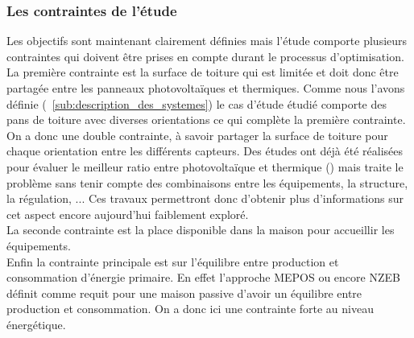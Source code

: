 \subsubsection{Les contraintes de l’étude} %
\label{ssub:les_contraintes_de_l_etude}
Les objectifs sont maintenant clairement définies mais l’étude comporte plusieurs
contraintes qui doivent être prises en compte durant le processus d’optimisation.
La première contrainte est la surface de toiture qui est limitée et doit donc être
partagée entre les panneaux photovoltaïques et thermiques. Comme nous l’avons définie
(~\autoref{sub:description_des_systemes}) le cas d’étude étudié comporte des pans
de toiture avec diverses orientations ce qui complète la première contrainte.
On a donc une double contrainte, à savoir
partager la surface de toiture pour chaque orientation entre les différents capteurs.
Des études ont déjà été réalisées pour évaluer le meilleur ratio entre photovoltaïque
et thermique (\cite{}) mais traite le problème sans tenir compte des combinaisons
entre les équipements, la structure, la régulation, ... Ces travaux permettront donc
d’obtenir plus d’informations sur cet aspect encore aujourd’hui faiblement exploré.
\\

La seconde contrainte est la place disponible dans la maison pour accueillir les
équipements.
\\

Enfin la contrainte principale est sur l’équilibre entre production et consommation
d’énergie primaire. En effet l’approche MEPOS ou encore NZEB définit comme requit
pour une maison passive d’avoir un équilibre entre production et consommation.
On a donc ici une contrainte forte au niveau énergétique.
\\


